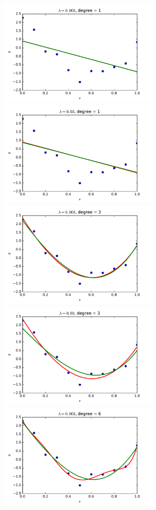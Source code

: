 \documentclass{article}
\begin{document}
\begin{multicols}{2}
\begin{figure}[p] %
   \centering
   \includegraphics[width=3in]{img/3-1_ridge_lambd3_degree1.pdf}
   \includegraphics[width=3in]{img/3-1_ridge_lambd30_degree1.pdf}
   \includegraphics[width=3in]{img/3-1_ridge_lambd3_degree3.pdf}
   \includegraphics[width=3in]{img/3-1_ridge_lambd30_degree3.pdf}
   \includegraphics[width=3in]{img/3-1_ridge_lambd3_degree6.pdf}

\end{figure}
\end{multicols}
\end{document}
